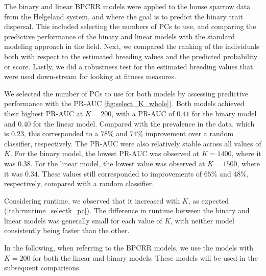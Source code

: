 
The binary and linear BPCRR models were applied to the house sparrow data from the Helgeland system, and where the goal is to predict the binary trait dispersal. This included selecting the numbers of PCs to use, and comparing the predictive performance of the binary and linear models with the standard modeling approach in the field. Next, we compared the ranking of the individuals both with respect to the estimated breeding values and the predicted probability or score. Lastly, we did a robustness test for the estimated breeding values that were used down-stream for looking at fitness measures. 

We selected the number of PCs to use for both models by assessing predictive performance with the PR-AUC \autoref{fig:select_K_whole}). Both models achieved their highest PR-AUC at $K = 200$, with a PR-AUC of $0.41$ for the binary model and $0.40$ for the linear model. Compared with the prevalence in the data, which is $0.23$, this corresponded to a $78\%$ and $74\%$ improvement over a random classifier, respectively.
The PR-AUC were also relatively stable across all values of $K$. For the binary model, the lowest PR-AUC was observed at $K = 1400$, where it was $0.38$. For the linear model, the lowest value was observed at $K = 1500$, where it was $0.34$. These values still corresponded to improvements of $65\%$ and $48\%$, respectively, compared with a random classifier.

Considering runtime, we observed that it increased with $K$, as expected (\autoref{tab:runtime_selectk_pc}). The difference in runtime between the binary and linear models was generally small for each value of $K$, with neither model consistently being faster than the other.

In the following, when referring to the BPCRR models, we use the models with $K = 200$ for both the linear and binary models. These models will be used in the subsequent comparisons.



